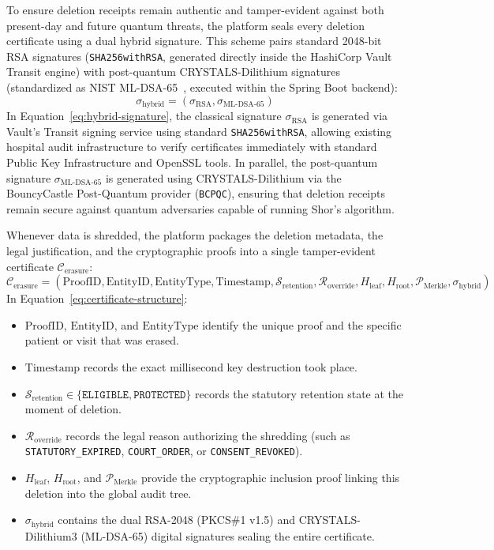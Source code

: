 To ensure deletion receipts remain authentic and tamper-evident against both present-day and future quantum threats, the platform seals every deletion certificate using a dual hybrid signature. This scheme pairs standard 2048-bit RSA signatures (\texttt{SHA256withRSA}, generated directly inside the HashiCorp Vault Transit engine) with post-quantum CRYSTALS-Dilithium signatures (standardized as NIST ML-DSA-65~\cite{nist_fips_204}, executed within the Spring Boot backend):
\begin{equation}
    \sigma_{\text{hybrid}} = \left(\sigma_{\text{RSA}}, \sigma_{\text{ML-DSA-65}}\right)
    \label{eq:hybrid-signature}
\end{equation}
In Equation~\ref{eq:hybrid-signature}, the classical signature $\sigma_{\text{RSA}}$ is generated via Vault's Transit signing service using standard \texttt{SHA256withRSA}, allowing existing hospital audit infrastructure to verify certificates immediately with standard Public Key Infrastructure and OpenSSL tools. In parallel, the post-quantum signature $\sigma_{\text{ML-DSA-65}}$ is generated using CRYSTALS-Dilithium via the BouncyCastle Post-Quantum provider (\texttt{BCPQC}), ensuring that deletion receipts remain secure against quantum adversaries capable of running Shor's algorithm.

Whenever data is shredded, the platform packages the deletion metadata, the legal justification, and the cryptographic proofs into a single tamper-evident certificate $\mathcal{C}_{\text{erasure}}$:
\begin{equation}
    \mathcal{C}_{\text{erasure}} = \left( \text{ProofID}, \text{EntityID}, \text{EntityType}, \text{Timestamp}, \mathcal{S}_{\text{retention}}, \mathcal{R}_{\text{override}}, H_{\text{leaf}}, H_{\text{root}}, \mathcal{P}_{\text{Merkle}}, \sigma_{\text{hybrid}} \right)
    \label{eq:certificate-structure}
\end{equation}
In Equation~\ref{eq:certificate-structure}:
\begin{itemize}
    \item $\text{ProofID}$, $\text{EntityID}$, and $\text{EntityType}$ identify the unique proof and the specific patient or visit that was erased.
    \item $\text{Timestamp}$ records the exact millisecond key destruction took place.
    \item $\mathcal{S}_{\text{retention}} \in \{\texttt{ELIGIBLE}, \texttt{PROTECTED}\}$ records the statutory retention state at the moment of deletion.
    \item $\mathcal{R}_{\text{override}}$ records the legal reason authorizing the shredding (such as \texttt{STATUTORY\_EXPIRED}, \texttt{COURT\_ORDER}, or \texttt{CONSENT\_REVOKED}).
    \item $H_{\text{leaf}}$, $H_{\text{root}}$, and $\mathcal{P}_{\text{Merkle}}$ provide the cryptographic inclusion proof linking this deletion into the global audit tree.
    \item $\sigma_{\text{hybrid}}$ contains the dual RSA-2048 (PKCS\#1 v1.5) and CRYSTALS-Dilithium3 (ML-DSA-65) digital signatures sealing the entire certificate.
\end{itemize}

